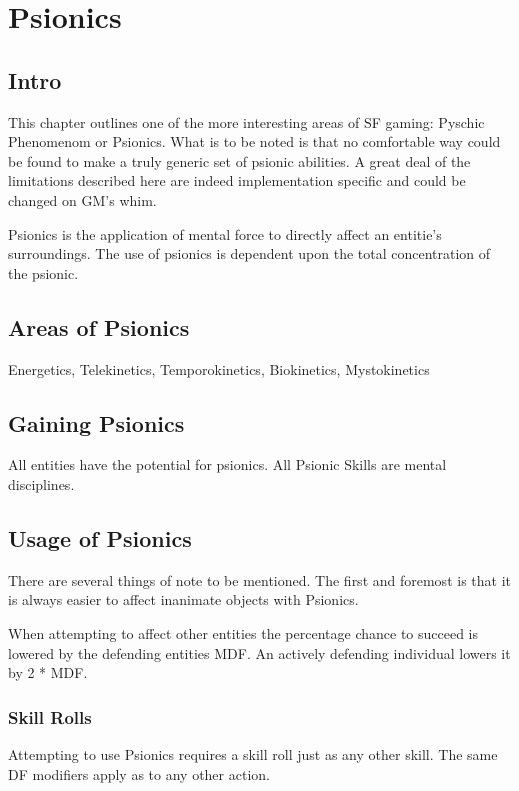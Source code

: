 \chapter{Psionics}

\section{Intro}

This chapter outlines one of the more interesting areas of SF gaming: 
Pyschic Phenomenom or Psionics. What is to be noted is that no 
comfortable way could be found to make a truly generic set of psionic 
abilities. A great deal of the limitations described here are indeed 
implementation specific and could be changed on GM's whim.

Psionics is the application of mental force to directly affect an entitie's
surroundings. The use of psionics is dependent upon the total concentration
of the psionic. 

\section{Areas of Psionics}

Energetics, Telekinetics, Temporokinetics, Biokinetics, Mystokinetics

\section{Gaining Psionics}

All entities have the potential for psionics. 
All Psionic Skills are mental disciplines.

\section{Usage of Psionics}

There are several things of note to be mentioned. The first and foremost
is that it is always easier to affect inanimate objects with Psionics.

When attempting to affect other entities the percentage chance to succeed
is lowered by the defending entities MDF. An actively defending individual
lowers it by 2 * MDF.

\subsection{Skill Rolls}

Attempting to use Psionics requires a skill roll just as any other skill.
The same DF modifiers apply as to any other action. 

